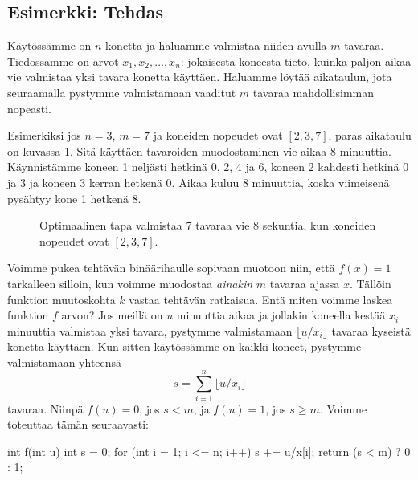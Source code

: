 \subsection{Esimerkki: Tehdas}

Käytössämme on $n$ konetta
ja haluamme valmistaa niiden avulla $m$ tavaraa.
Tiedossamme on arvot $x_1,x_2,\dots,x_n$:
jokaisesta koneesta tieto, kuinka paljon aikaa vie valmistaa
yksi tavara konetta käyttäen.
Haluamme löytää aikataulun, jota seuraamalla pystymme valmistamaan
vaaditut $m$ tavaraa mahdollisimman nopeasti.

Esimerkiksi jos $n=3$, $m=7$ ja koneiden nopeudet ovat $[2,3,7]$,
paras aikataulu on kuvassa \ref{fig:optkon}.
Sitä käyttäen tavaroiden muodostaminen vie aikaa $8$ minuuttia.
Käynnistämme koneen 1 neljästi hetkinä 0, 2, 4 ja 6,
koneen 2 kahdesti hetkinä 0 ja 3
ja koneen 3 kerran hetkenä 0.
Aikaa kuluu $8$ minuuttia, koska viimeisenä pysähtyy kone 1 hetkenä 8.

\begin{figure}
\center
{}
\caption{Optimaalinen tapa valmistaa 7 tavaraa vie 8 sekuntia,
kun koneiden nopeudet ovat $[2,3,7]$.}
\label{fig:optkon}
\end{figure}

Voimme pukea tehtävän binäärihaulle sopivaan muotoon niin,
että $f(x)=1$ tarkalleen silloin, kun voimme muodostaa
\emph{ainakin} $m$ tavaraa ajassa $x$.
Tällöin funktion muutoskohta $k$ vastaa tehtävän ratkaisua.
Entä miten voimme laskea funktion $f$ arvon?
Jos meillä on $u$ minuuttia aikaa ja jollakin koneella kestää $x_i$
minuuttia valmistaa yksi tavara, pystymme valmistamaan
$\lfloor u/x_i \rfloor$ tavaraa kyseistä konetta käyttäen.
Kun sitten käytössämme on kaikki koneet,
pystymme valmistamaan yhteensä
\[ s = \sum_{i=1}^n \lfloor u/x_i \rfloor \]
tavaraa. Niinpä $f(u)=0$, jos $s<m$,
ja $f(u)=1$, jos $s \ge m$. Voimme toteuttaa tämän seuraavasti:

\begin{code}
int f(int u) {
    int s = 0;
    for (int i = 1; i <= n; i++) s += u/x[i];
    return (s < m) ? 0 : 1;
}
\end{code}

